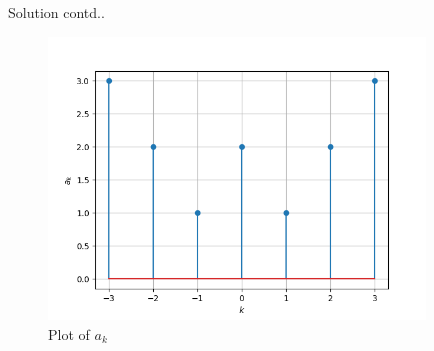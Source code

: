 \documentclass{beamer}
\begin{document}
\begin{frame}{Solution contd..}
\begin{figure}[!h]
         \centering
         \includegraphics[width=10cm]{plot.png}
         \caption{Plot of $a_k$}
         \label{plot}
\end{figure}
\end{frame}
\end{document}

